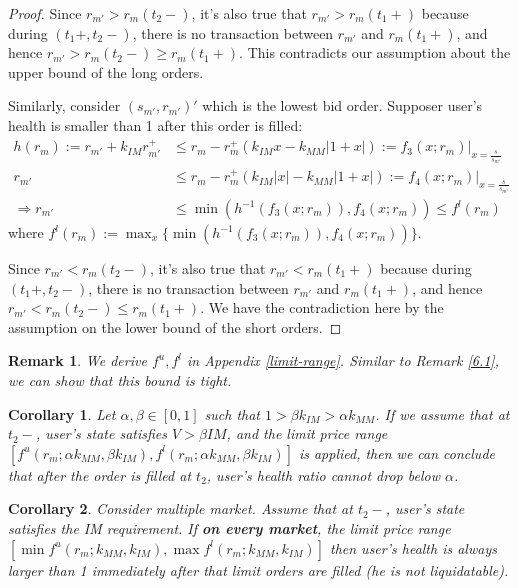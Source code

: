 \documentclass[notitlepage,reqno,11pt]{amsart}
\numberwithin{equation}{section}
\newtheorem{coro}{Corollary}[section]
\newtheorem{remark}{Remark}[section]
\newcommand{\af}{\alpha}
\newcommand{\bt}{\beta}
\newcommand{\RA}{\Rightarrow}
\begin{document}
\begin{proof}
Since $r_{m'} > r_m(t_2-)$, it's also true that $r_{m'} > r_m(t_1+)$ because during $(t_1+,t_2-)$, there is no transaction between $r_{m'}$ and $r_m(t_1+)$, and hence $r_{m'} > r_m(t_2-) \geq r_m(t_1+)$. This contradicts our assumption about the upper bound of the long orders.

Similarly, consider $(s_{m'},r_{m'})'$ which is the lowest bid order. Supposer user's health is smaller than 1 after this order is filled:
\begin{align*}
    h(r_m) := r_{m'} + k_{IM} r_{m'}^+ &\leq r_m - r_m^+(k_{IM}x - k_{MM}|1+x|) := f_3(x;r_m)|_{x=\frac{s}{s_{m'}}}\\
    r_{m'} &\leq r_m - r_m^+(k_{IM}|x| - k_{MM}|1+x|) := f_4(x;r_m)|_{x=\frac{s}{s_{m'}}}\\
    \RA r_{m'} &\leq \min(h^{-1}(f_3(x;r_m)), f_4(x;r_m)) \leq f^l(r_m)
\end{align*}
where $f^l(r_m) := \max_x\{\min(h^{-1}(f_3(x;r_m)), f_4(x;r_m))\}$. 

Since $r_{m'} < r_m(t_2-)$, it's also true that $r_{m'} < r_m(t_1+)$ because during $(t_1+,t_2-)$, there is no transaction between $r_{m'}$ and $r_m(t_1+)$, and hence $r_{m'} < r_m(t_2-) \leq r_m(t_1+)$. We have the contradiction here by the assumption on the lower bound of the short orders.

\end{proof}
\begin{remark}
    We derive $f^u, f^l$ in Appendix \ref{limit-range}. Similar to Remark \ref{6.1}, we can show that this bound is tight. 
\end{remark}

\begin{coro}
    Let $\af, \bt\in[0,1]$ such that $1 > \bt k_{IM} > \af k_{MM}$. If we assume that at $t_2-$, user's state satisfies $V > \bt IM$, and the limit price range $[f^u(r_m;\af k_{MM}, \bt k_{IM}), f^l(r_m;\af k_{MM}, \bt k_{IM})]$ is applied, then we can conclude that after the order is filled at $t_2$, user's health ratio cannot drop below $\af$.
\end{coro}

\begin{coro}
    Consider multiple market. Assume that at $t_2-$, user's state satisfies the IM requirement. If \textbf{on every market}, the limit price range $[\min f^u(r_m; k_{MM}, k_{IM}), \max f^l(r_m; k_{MM}, k_{IM})]$ then user's health is always larger than 1 immediately after that limit orders are filled (he is not liquidatable).
\end{coro}
\end{document}
